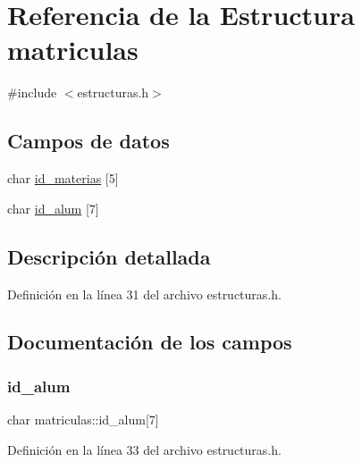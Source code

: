 \hypertarget{structmatriculas}{}\section{Referencia de la Estructura matriculas}
\label{structmatriculas}


{\ttfamily \#include $<$estructuras.\+h$>$}

\subsection*{Campos de datos}
\begin{DoxyCompactItemize}
\item 
char \mbox{\hyperlink{structmatriculas_a6433d557ea453570a08401f83be557d0}{id\+\_\+materias}} \mbox{[}5\mbox{]}
\item 
char \mbox{\hyperlink{structmatriculas_aff338fa16ed08905b6e2b214d743fb41}{id\+\_\+alum}} \mbox{[}7\mbox{]}
\end{DoxyCompactItemize}


\subsection{Descripción detallada}


Definición en la línea 31 del archivo estructuras.\+h.



\subsection{Documentación de los campos}
\mbox{\label{structmatriculas_aff338fa16ed08905b6e2b214d743fb41}} 
\subsubsection{\texorpdfstring{id\+\_\+alum}{id\_alum}}
{\footnotesize\ttfamily char matriculas\+::id\+\_\+alum\mbox{[}7\mbox{]}}



Definición en la línea 33 del archivo estructuras.\+h.

\mbox{\label{structmatriculas_a6433d557ea453570a08401f83be557d0}} 
